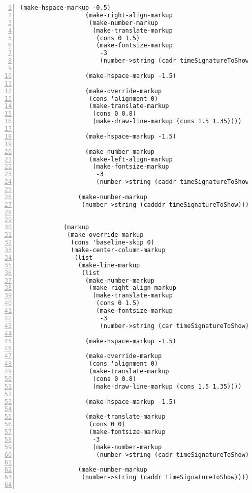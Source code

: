 \begin{Verbatim}[numbers=left,xleftmargin=5mm]
                  (make-hspace-markup -0.5)
                  (make-right-align-markup
                   (make-number-markup
                    (make-translate-markup
                     (cons 0 1.5)
                     (make-fontsize-markup
                      -3
                      (number->string (cadr timeSignatureToShow))))))

                  (make-hspace-markup -1.5)

                  (make-override-markup
                   (cons 'alignment 0)
                   (make-translate-markup
                    (cons 0 0.8)
                    (make-draw-line-markup (cons 1.5 1.35))))

                  (make-hspace-markup -1.5)

                  (make-number-markup
                   (make-left-align-markup
                    (make-fontsize-markup
                     -3
                     (number->string (caddr timeSignatureToShow)))))))

                (make-number-markup
                 (number->string (cadddr timeSignatureToShow)))))))


            (markup
             (make-override-markup
              (cons 'baseline-skip 0)
              (make-center-column-markup
               (list
                (make-line-markup
                 (list
                  (make-number-markup
                   (make-right-align-markup
                    (make-translate-markup
                     (cons 0 1.5)
                     (make-fontsize-markup
                      -3
                      (number->string (car timeSignatureToShow))))))

                  (make-hspace-markup -1.5)

                  (make-override-markup
                   (cons 'alignment 0)
                   (make-translate-markup
                    (cons 0 0.8)
                    (make-draw-line-markup (cons 1.5 1.35))))

                  (make-hspace-markup -1.5)

                  (make-translate-markup
                   (cons 0 0)
                   (make-fontsize-markup
                    -3
                    (make-number-markup
                     (number->string (cadr timeSignatureToShow)))))))

                (make-number-markup
                 (number->string (caddr timeSignatureToShow)))))))


\end{Verbatim}

